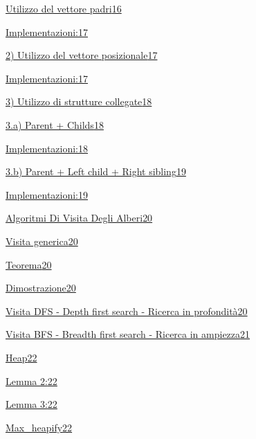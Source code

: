 \documentclass{article}
\begin{document}
{\protect\hyperlink{h.nrzs3ooed9o}{Utilizzo del vettore padri}}{\protect\hyperlink{h.nrzs3ooed9o}{16}}

{\protect\hyperlink{h.ncrwkhkrovb2}{Implementazioni:}}{\protect\hyperlink{h.ncrwkhkrovb2}{17}}

{\protect\hyperlink{h.5u7fhayyby4r}{2) Utilizzo del vettore posizionale}}{\protect\hyperlink{h.5u7fhayyby4r}{17}}

{\protect\hyperlink{h.6c4aui6rl05k}{Implementazioni:}}{\protect\hyperlink{h.6c4aui6rl05k}{17}}

{\protect\hyperlink{h.bhzctdrna7ur}{3) Utilizzo di strutture collegate}}{\protect\hyperlink{h.bhzctdrna7ur}{18}}

{\protect\hyperlink{h.qoohix7mgjib}{3.a) Parent + Childs}}{\protect\hyperlink{h.qoohix7mgjib}{18}}

{\protect\hyperlink{h.7iunf1nu58vy}{Implementazioni:}}{\protect\hyperlink{h.7iunf1nu58vy}{18}}

{\protect\hyperlink{h.jlqu76iomg9e}{3.b) Parent + Left child + Right sibling}}{\protect\hyperlink{h.jlqu76iomg9e}{19}}

{\protect\hyperlink{h.ekfyi4oujqjt}{Implementazioni:}}{\protect\hyperlink{h.ekfyi4oujqjt}{19}}

{\protect\hyperlink{h.ike679k4smgg}{Algoritmi Di Visita Degli Alberi}}{\protect\hyperlink{h.ike679k4smgg}{20}}

{\protect\hyperlink{h.dvc71mavuqx7}{Visita generica}}{\protect\hyperlink{h.dvc71mavuqx7}{20}}

{\protect\hyperlink{h.6xasx7f8zgn1}{Teorema}}{\protect\hyperlink{h.6xasx7f8zgn1}{20}}

{\protect\hyperlink{h.zdc8liauzt1c}{Dimostrazione}}{\protect\hyperlink{h.zdc8liauzt1c}{20}}

{\protect\hyperlink{h.5u7m241wpdag}{Visita DFS - Depth first search - Ricerca in profondità}}{\protect\hyperlink{h.5u7m241wpdag}{20}}

{\protect\hyperlink{h.j29c1mxwyzyn}{Visita BFS - Breadth first search - Ricerca in ampiezza}}{\protect\hyperlink{h.j29c1mxwyzyn}{21}}

{\protect\hyperlink{h.8cvon0yw5yug}{Heap}}{\protect\hyperlink{h.8cvon0yw5yug}{22}}

{\protect\hyperlink{h.twk46x6owxrr}{Lemma 2:}}{\protect\hyperlink{h.twk46x6owxrr}{22}}

{\protect\hyperlink{h.wlc8yrs7inpk}{Lemma 3:}}{\protect\hyperlink{h.wlc8yrs7inpk}{22}}

{\protect\hyperlink{h.t1rcecigqmbx}{Max\_heapify}}{\protect\hyperlink{h.t1rcecigqmbx}{22}}
\end{document}
